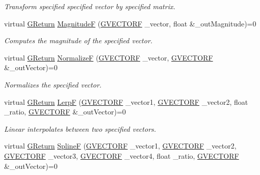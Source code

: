 \begin{DoxyCompactItemize}
\begin{DoxyCompactList}\small\item\em Transform specified specified vector by specified matrix. \end{DoxyCompactList}\item 
virtual \mbox{\hyperlink{namespaceGW_a67a839e3df7ea8a5c5686613a7a3de21}{G\+Return}} \mbox{\hyperlink{classGW_1_1MATH_1_1GVector_afa368c95bea737f3bd63baf14678d0a9}{MagnitudeF}} (\mbox{\hyperlink{structGW_1_1MATH_1_1GVECTORF}{G\+V\+E\+C\+T\+O\+RF}} \+\_\+vector, float \&\+\_\+out\+Magnitude)=0
\begin{DoxyCompactList}\small\item\em Computes the magnitude of the specified vector. \end{DoxyCompactList}\item 
virtual \mbox{\hyperlink{namespaceGW_a67a839e3df7ea8a5c5686613a7a3de21}{G\+Return}} \mbox{\hyperlink{classGW_1_1MATH_1_1GVector_a736e7cf06c1226df11c092e67f0689ab}{NormalizeF}} (\mbox{\hyperlink{structGW_1_1MATH_1_1GVECTORF}{G\+V\+E\+C\+T\+O\+RF}} \+\_\+vector, \mbox{\hyperlink{structGW_1_1MATH_1_1GVECTORF}{G\+V\+E\+C\+T\+O\+RF}} \&\+\_\+out\+Vector)=0
\begin{DoxyCompactList}\small\item\em Normalizes the specified vector. \end{DoxyCompactList}\item 
virtual \mbox{\hyperlink{namespaceGW_a67a839e3df7ea8a5c5686613a7a3de21}{G\+Return}} \mbox{\hyperlink{classGW_1_1MATH_1_1GVector_aa94d4c2613539433865e684edbaf96b3}{LerpF}} (\mbox{\hyperlink{structGW_1_1MATH_1_1GVECTORF}{G\+V\+E\+C\+T\+O\+RF}} \+\_\+vector1, \mbox{\hyperlink{structGW_1_1MATH_1_1GVECTORF}{G\+V\+E\+C\+T\+O\+RF}} \+\_\+vector2, float \+\_\+ratio, \mbox{\hyperlink{structGW_1_1MATH_1_1GVECTORF}{G\+V\+E\+C\+T\+O\+RF}} \&\+\_\+out\+Vector)=0
\begin{DoxyCompactList}\small\item\em Linear interpolates between two specified vectors. \end{DoxyCompactList}\item 
virtual \mbox{\hyperlink{namespaceGW_a67a839e3df7ea8a5c5686613a7a3de21}{G\+Return}} \mbox{\hyperlink{classGW_1_1MATH_1_1GVector_a8e55aed1762134abcfd485099813ae64}{SplineF}} (\mbox{\hyperlink{structGW_1_1MATH_1_1GVECTORF}{G\+V\+E\+C\+T\+O\+RF}} \+\_\+vector1, \mbox{\hyperlink{structGW_1_1MATH_1_1GVECTORF}{G\+V\+E\+C\+T\+O\+RF}} \+\_\+vector2, \mbox{\hyperlink{structGW_1_1MATH_1_1GVECTORF}{G\+V\+E\+C\+T\+O\+RF}} \+\_\+vector3, \mbox{\hyperlink{structGW_1_1MATH_1_1GVECTORF}{G\+V\+E\+C\+T\+O\+RF}} \+\_\+vector4, float \+\_\+ratio, \mbox{\hyperlink{structGW_1_1MATH_1_1GVECTORF}{G\+V\+E\+C\+T\+O\+RF}} \&\+\_\+out\+Vector)=0

\end{DoxyCompactItemize}
